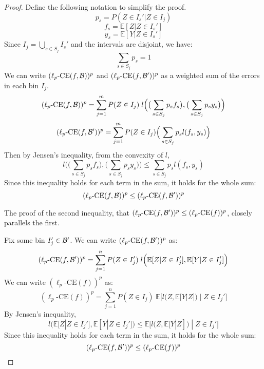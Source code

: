 \begin{proof}
Define the following notation to simplify the proof.
\[ p_s = P(Z \in I_s' | Z \in I_j) \]
\[ f_s = \mathbb{E}[Z | Z \in I_s']\]
\[ y_s = \mathbb{E}[Y | Z \in I_s']\]
Since $I_j = \bigcup_{s \in S_j} I_s'$ and the intervals are disjoint, we have:
\[ \sum_{s \in S_j} p_s = 1 \]
We can write $(\ell_p\mbox{-CE}(f, \mathcal{B}{}))^p$ and $(\ell_p\mbox{-CE}(f, \mathcal{B}{}'))^p$ as a weighted sum of the errors in each bin $I_j$.
\[ (\ell_p\mbox{-CE}(f, \mathcal{B}{}))^p = \sum_{j=1}^m P(Z \in I_j) \; l\Big( \big( \sum_{s \in S_j} p_s f_s \big), \big( \sum_{s \in S_j} p_s y_s \big) \Big) \]
\[ (\ell_p\mbox{-CE}(f, \mathcal{B}{}'))^p = \sum_{j=1}^m P(Z \in I_j) \Big( \sum_{s \in S_j} p_s l(f_s, y_s) \Big) \]
Then by Jensen's inequality, from the convexity of $l$,
\[ l\Big( \big( \sum_{s \in S_j} p_s f_s \big), \big( \sum_{s \in S_j} p_s y_s \big) \Big) \leq \sum_{s \in S_j} p_s l(f_s, y_s)  \]
Since this inequality holds for each term in the sum, it holds for the whole sum:
\[ (\ell_p\mbox{-CE}(f, \mathcal{B}{}))^p \leq (\ell_p\mbox{-CE}(f, \mathcal{B}{}'))^p \]

The proof of the second inequality, that $(\ell_p\mbox{-CE}(f, \mathcal{B}{}'))^p \leq (\ell_p\mbox{-CE}(f))^p$, closely parallels the first.

Fix some bin $I_j' \in \mathcal{B}{}'$. We can write $(\ell_p\mbox{-CE}(f, \mathcal{B}{}'))^p$ as:
\[ (\ell_p\mbox{-CE}(f, \mathcal{B}{}'))^p = \sum_{j=1}^n P(Z \in I_j') \; l\Big( \mathbb{E}[Z | Z \in I_j'], \mathbb{E}[Y | Z \in I_j'] \Big) \]
We can write $(\ell_p\mbox{-CE}(f))^p$ as:
\[ (\ell_p\mbox{-CE}(f))^p = \sum_{j=1}^n P(Z \in I_j) \; \mathbb{E}\Big[ l\big( Z, \mathbb{E}[Y | Z] \big) \; | \; Z \in I_j' \Big] \]
By Jensen's inequality,
\[ l\Big( \mathbb{E}[Z | Z \in I_j'], \mathbb{E}[Y | Z \in I_j'] \Big) \leq \mathbb{E}\Big[ l\big( Z, \mathbb{E}[Y | Z] \big) \; | \; Z \in I_j' \Big] \]
Since this inequality holds for each term in the sum, it holds for the whole sum:
\[ (\ell_p\mbox{-CE}(f, \mathcal{B}{}'))^p \leq (\ell_p\mbox{-CE}(f))^p \]
\end{proof}
